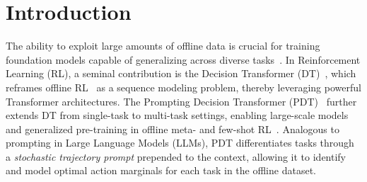 \documentclass{article} %
\begin{document}


\section{Introduction}
\label{sec:introduction}

The ability to exploit large amounts of offline data is crucial for training foundation models capable of generalizing across diverse tasks~\citep{radford2018improving, reed2022generalist, brohan2022rt}. In Reinforcement Learning (RL), a seminal contribution is the Decision Transformer (DT)~\citep{chen2021decision}, which reframes offline RL~\citep{levine2020offline} as a sequence modeling problem, thereby leveraging powerful Transformer architectures. The Prompting Decision Transformer (PDT)~\citep{xu2022prompting} further extends DT from single-task to multi-task settings, enabling large-scale models and generalized pre-training in offline meta- and few-shot RL~\citep{xu2022prompting, mitchell2021offline}. Analogous to prompting in Large Language Models (LLMs), PDT differentiates tasks through a \textit{stochastic trajectory prompt} prepended to the context, allowing it to identify and model optimal action marginals for each task in the offline dataset.
\end{document}
